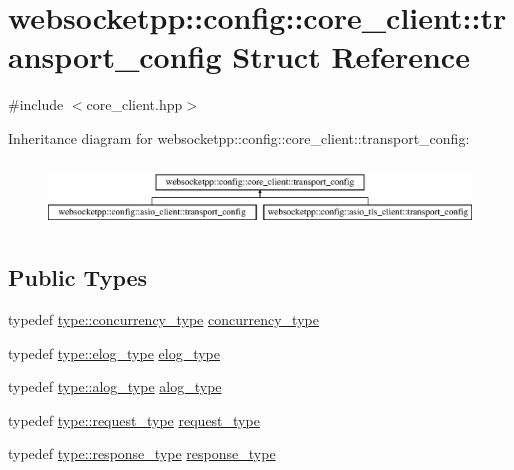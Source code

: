\hypertarget{structwebsocketpp_1_1config_1_1core__client_1_1transport__config}{}\section{websocketpp\+:\+:config\+:\+:core\+\_\+client\+:\+:transport\+\_\+config Struct Reference}
\label{structwebsocketpp_1_1config_1_1core__client_1_1transport__config}


{\ttfamily \#include $<$core\+\_\+client.\+hpp$>$}

Inheritance diagram for websocketpp\+:\+:config\+:\+:core\+\_\+client\+:\+:transport\+\_\+config\+:\begin{figure}[H]
\begin{center}
\leavevmode
\includegraphics[height=1.766562cm]{structwebsocketpp_1_1config_1_1core__client_1_1transport__config}
\end{center}
\end{figure}
\subsection*{Public Types}
\begin{DoxyCompactItemize}
\item 
typedef \hyperlink{structwebsocketpp_1_1config_1_1core__client_a4efeeb870e648c7405daab92d10fa5d6}{type\+::concurrency\+\_\+type} \hyperlink{structwebsocketpp_1_1config_1_1core__client_1_1transport__config_a5389723cc4121177af00f6f32fe0f89d}{concurrency\+\_\+type}
\item 
typedef \hyperlink{structwebsocketpp_1_1config_1_1core__client_a24f1bae9e8a92bf7950153ed39eaffb8}{type\+::elog\+\_\+type} \hyperlink{structwebsocketpp_1_1config_1_1core__client_1_1transport__config_a898406c4885d089ecd5e384044645c84}{elog\+\_\+type}
\item 
typedef \hyperlink{structwebsocketpp_1_1config_1_1core__client_a98c19fba0898e3842c001248df82fb2a}{type\+::alog\+\_\+type} \hyperlink{structwebsocketpp_1_1config_1_1core__client_1_1transport__config_aa41ba2c4801fadf51c399fd409118c61}{alog\+\_\+type}
\item 
typedef \hyperlink{structwebsocketpp_1_1config_1_1core__client_a1fd74b16e3add246b1c356f6f14f206b}{type\+::request\+\_\+type} \hyperlink{structwebsocketpp_1_1config_1_1core__client_1_1transport__config_a81d8b4e1d7bb8975731aa03690821fa4}{request\+\_\+type}
\item 
typedef \hyperlink{structwebsocketpp_1_1config_1_1core__client_a5d8d6a90c7f36442a61a615da2ac8dcc}{type\+::response\+\_\+type} \hyperlink{structwebsocketpp_1_1config_1_1core__client_1_1transport__config_ae2a3007f9ac70a89ce353db54dda0ad8}{response\+\_\+type}
\end{DoxyCompactItemize}
